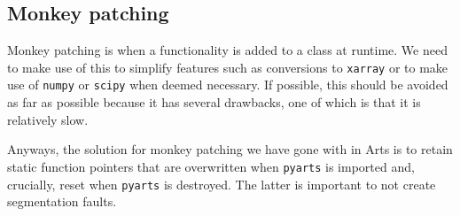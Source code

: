 \subsection{Monkey patching}
Monkey patching is when a functionality is added to a class at runtime.  We need to make use of this to simplify features such as
conversions to \verb|xarray| or to make use of \verb|numpy| or \verb|scipy| when deemed necessary.  If possible, this should be
avoided as far as possible because it has several drawbacks, one of which is that it is relatively slow.

Anyways, the solution for monkey patching we have gone with in Arts is to retain static function pointers that are overwritten
when \verb|pyarts| is imported and, crucially, reset when \verb|pyarts| is destroyed.  The latter is important to not create
segmentation faults.

